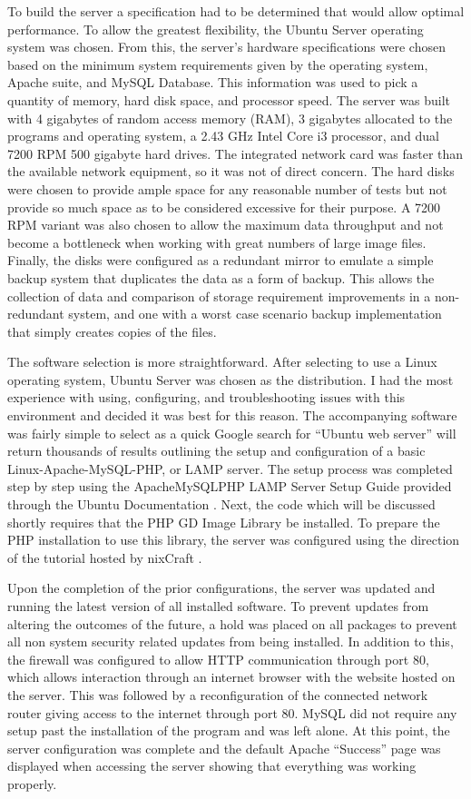 To build the server a specification had to be determined that would allow optimal performance. To allow the greatest flexibility, the Ubuntu Server operating system was chosen. From this, the server's hardware specifications were chosen based on the minimum system requirements given by the operating system, Apache suite, and MySQL Database. This information was used to pick a quantity of memory, hard disk space, and processor speed. The server was built with 4 gigabytes of random access memory (RAM), 3 gigabytes allocated to the programs and operating system, a 2.43 GHz Intel Core i3 processor, and dual 7200 RPM 500 gigabyte hard drives. The integrated network card was faster than the available network equipment, so it was not of direct concern. The hard disks were chosen to provide ample space for any reasonable number of tests but not provide so much space as to be considered excessive for their purpose. A 7200 RPM variant was also chosen to allow the maximum data throughput and not become a bottleneck when working with great numbers of large image files. Finally, the disks were configured as a redundant mirror to emulate a simple backup system that duplicates the data as a form of backup. This allows the collection of data and comparison of storage requirement improvements in a non-redundant system, and one with a worst case scenario backup implementation that simply creates copies of the files.

The software selection is more straightforward. After selecting to use a Linux operating system, Ubuntu Server was chosen as the distribution. I had the most experience with using, configuring, and troubleshooting issues with this environment and decided it was best for this reason. The accompanying software was fairly simple to select as a quick Google search for ``Ubuntu web server'' will return thousands of results outlining the setup and configuration of a basic Linux-Apache-MySQL-PHP, or LAMP server. The setup process was completed step by step using the ApacheMySQLPHP LAMP Server Setup Guide provided through the Ubuntu Documentation \cite{ubuntu:lampsetup}. Next, the code which will be discussed shortly requires that the PHP GD Image Library be installed. To prepare the PHP installation to use this library, the server was configured using the direction of the tutorial hosted by nixCraft \cite{nix:gdsetup}.

Upon the completion of the prior configurations, the server was updated and running the latest version of all installed software. To prevent updates from altering the outcomes of the future, a hold was placed on all packages to prevent all non system security related updates from being installed. In addition to this, the firewall was configured to allow HTTP communication through port 80, which allows interaction through an internet browser with the website hosted on the server. This was followed by a reconfiguration of the connected network router giving access to the internet through port 80. MySQL did not require any setup past the installation of the program and was left alone. At this point, the server configuration was complete and the default Apache ``Success'' page was displayed when accessing the server showing that everything was working properly.

